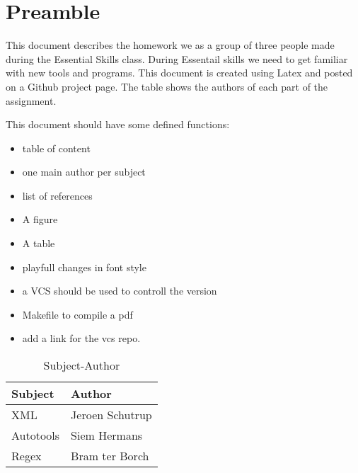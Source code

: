 \section{Preamble}
This document describes the homework we as a group of three people made during the Essential Skills
class. During Essentail skills we need to get familiar with new tools and programs.
This document is created using Latex and posted on a Github project page. The table shows the 
authors of each part of the assignment.

This document should have some defined functions:
\begin{itemize}
	\item table of content
	\item one main author per subject
	\item list of references
	\item A figure
	\item A table
	\item playfull changes in font style
	\item a VCS should be used to controll the version
	\item Makefile to compile a pdf
	\item add a link for the vcs repo.
\end{itemize}

\begin{table}[h]
\begin{center}
\caption{Subject-Author}
\label{table:subject-author}
\begin{tabular}{ | l | l | }
\hline
\textbf{Subject} & \textbf{Author} \\
\hline
XML              & Jeroen Schutrup \\
\hline
Autotools        & Siem Hermans  \\
\hline
Regex            & Bram ter Borch  \\
\hline
\end{tabular}
\end{center}
\end{table}